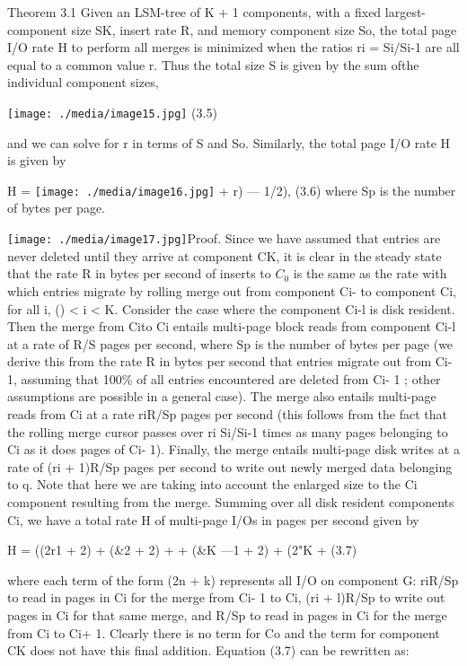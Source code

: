 \documentclass[a4paper,12pt,notitlepage,twoside,openright]{article}
\begin{document}
Theorem 3.1 Given an LSM-tree of K + 1 components, with a fixed
largest-component size SK, insert rate R, and memory component size So,
the total page I/O rate H to perform all merges is minimized when the
ratios ri = Si/Si-1 are all equal to a common value r. Thus the total
size S is given by the sum ofthe individual component sizes,


\texttt{[image: ./media/image15.jpg]}
(3.5)


and we can solve for r in terms of S and So. Similarly, the total page
I/O rate H is given by

H =
\texttt{[image: ./media/image16.jpg]}
+ r) --- 1/2), (3.6) where Sp is the number of bytes per page.

\texttt{[image: ./media/image17.jpg]}Proof. Since we have assumed that
entries are never deleted until they arrive at component CK, it is clear
in the steady state that the rate R in bytes per second of inserts to \(C_0\)
is the same as the rate with which entries migrate by rolling merge out
from component Ci- to component Ci, for all i, () \textless{} i
\textless{} K. Consider the case where the component Ci-l is disk
resident. Then the merge from Cito Ci entails multi-page block reads
from component Ci-l at a rate of R/S pages per second, where Sp is the
number of bytes per page (we derive this from the rate R in bytes per
second that entries migrate out from Ci- 1, assuming that 100\% of all
entries encountered are deleted from Ci- 1 ; other assumptions are
possible in a general case). The merge also entails multi-page reads
from Ci at a rate riR/Sp pages per second (this follows from the fact
that the rolling merge cursor passes over ri Si/Si-1 times as many pages
belonging to Ci as it does pages of Ci- 1). Finally, the merge entails
multi-page disk writes at a rate of (ri + 1)R/Sp pages per second to
write out newly merged data belonging to q. Note that here we are taking
into account the enlarged size to the Ci component resulting from the
merge. Summing over all disk resident components Ci, we have a total
rate H of multi-page I/Os in pages per second given by


H = ((2r1 + 2) + (\&2 + 2) + + (\&K ---1 + 2) + (2"K + (3.7)


where each term of the form (2n + k) represents all I/O on component G:
riR/Sp to read in pages in Ci for the merge from Ci- 1 to Ci, (ri +
l)R/Sp to write out pages in Ci for that same merge, and R/Sp to read in
pages in Ci for the merge from Ci to Ci+ 1. Clearly there is no term for
Co and the term for component CK does not have this final addition.
Equation (3.7) can be rewritten as:
\end{document}
